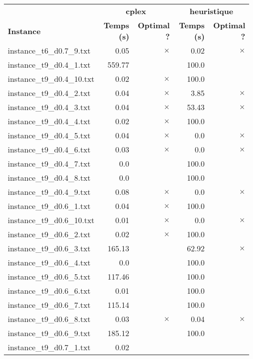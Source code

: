 \documentclass{article}
\begin{document}
\newpage
\begin{center}
\renewcommand{\arraystretch}{1.4}
 \begin{tabular}{lrrrr}
	\hline
 & \multicolumn{2}{c}{\textbf{cplex}} & \multicolumn{2}{c}{\textbf{heuristique}}\\
\textbf{Instance}  & \textbf{Temps (s)} & \textbf{Optimal ?}  & \textbf{Temps (s)} & \textbf{Optimal ?} \\\hline

instance\_t6\_d0.7\_9.txt & 0.05 & 
$\times$
 & 0.02 & 
$\times$
\\
instance\_t9\_d0.4\_1.txt & 559.77 & 
 & 100.0 & 
\\
instance\_t9\_d0.4\_10.txt & 0.02 & 
$\times$
 & 100.0 & 
\\
instance\_t9\_d0.4\_2.txt & 0.04 & 
$\times$
 & 3.85 & 
$\times$
\\
instance\_t9\_d0.4\_3.txt & 0.04 & 
$\times$
 & 53.43 & 
$\times$
\\
instance\_t9\_d0.4\_4.txt & 0.02 & 
$\times$
 & 100.0 & 
\\
instance\_t9\_d0.4\_5.txt & 0.04 & 
$\times$
 & 0.0 & 
$\times$
\\
instance\_t9\_d0.4\_6.txt & 0.03 & 
$\times$
 & 0.0 & 
$\times$
\\
instance\_t9\_d0.4\_7.txt & 0.0 & 
 & 100.0 & 
\\
instance\_t9\_d0.4\_8.txt & 0.0 & 
 & 100.0 & 
\\
instance\_t9\_d0.4\_9.txt & 0.08 & 
$\times$
 & 0.0 & 
$\times$
\\
instance\_t9\_d0.6\_1.txt & 0.04 & 
$\times$
 & 100.0 & 
\\
instance\_t9\_d0.6\_10.txt & 0.01 & 
$\times$
 & 0.0 & 
$\times$
\\
instance\_t9\_d0.6\_2.txt & 0.02 & 
$\times$
 & 100.0 & 
\\
instance\_t9\_d0.6\_3.txt & 165.13 & 
 & 62.92 & 
$\times$
\\
instance\_t9\_d0.6\_4.txt & 0.0 & 
 & 100.0 & 
\\
instance\_t9\_d0.6\_5.txt & 117.46 & 
 & 100.0 & 
\\
instance\_t9\_d0.6\_6.txt & 0.01 & 
 & 100.0 & 
\\
instance\_t9\_d0.6\_7.txt & 115.14 & 
 & 100.0 & 
\\
instance\_t9\_d0.6\_8.txt & 0.03 & 
$\times$
 & 0.04 & 
$\times$
\\
instance\_t9\_d0.6\_9.txt & 185.12 & 
 & 100.0 & 
\\
instance\_t9\_d0.7\_1.txt & 0.02 & 

\end{tabular}
\end{center}
\end{document}
